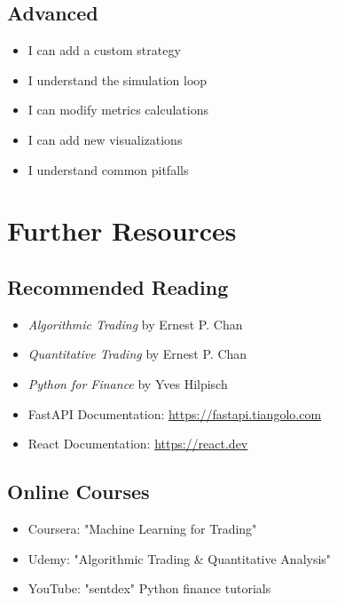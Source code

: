 \documentclass[11pt,a4paper]{article}
\begin{document}
\subsection{Advanced}
\begin{itemize}
  \item[$\square$] I can add a custom strategy
  \item[$\square$] I understand the simulation loop
  \item[$\square$] I can modify metrics calculations
  \item[$\square$] I can add new visualizations
  \item[$\square$] I understand common pitfalls
\end{itemize}

\section{Further Resources}

\subsection{Recommended Reading}
\begin{itemize}
  \item \textit{Algorithmic Trading} by Ernest P. Chan
  \item \textit{Quantitative Trading} by Ernest P. Chan
  \item \textit{Python for Finance} by Yves Hilpisch
  \item FastAPI Documentation: \url{https://fastapi.tiangolo.com}
  \item React Documentation: \url{https://react.dev}
\end{itemize}

\subsection{Online Courses}
\begin{itemize}
  \item Coursera: "Machine Learning for Trading"
  \item Udemy: "Algorithmic Trading \& Quantitative Analysis"
  \item YouTube: "sentdex" Python finance tutorials
\end{itemize}
\end{document}
